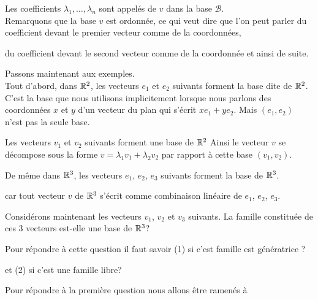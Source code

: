 \change
Les coefficients $\lambda_1,\ldots,\lambda_n$ sont appelés  de $v$ dans la base $\mathcal{B}$. \\

\change
Remarquons que la base $v$ est ordonnée, ce qui veut dire que l'on peut 
parler du coefficient devant le premier vecteur comme de la  coordonnées, 

\change
du coefficient devant le second vecteur comme de la  coordonnée et ainsi de suite.




\diapo
Passons maintenant aux exemples.\\

Tout d'abord, dans $\mathbb{R}^2$, les vecteurs $e_1$ et $e_2$ 
suivants forment la base dite  de $\mathbb{R}^2$. 
C'est la base que nous utilisons implicitement  
lorsque nous parlons des coordonnées $x$ et $y$ d'un vecteur du plan qui s'écrit
$xe_1+ye_2$. 
Mais $(e_1,e_2)$ n'est pas la seule base.

\change
Les vecteurs $v_1$ et $v_2$ suivants forment  une base de $\mathbb{R}^2$ 
Ainsi le  vecteur $v$ 
se décompose sous la forme $v=\lambda_1 v_1 + \lambda_2 v_2$
par rapport à cette base $(v_1, v_2)$.

\change
De même dans $\mathbb{R}^3$, les vecteurs $e_1$, $e_2$, $e_3$ 
suivants forment la base  de $\mathbb{R}^3$.

\change
car tout vecteur $v$ de $\mathbb{R}^3$ s'écrit comme combinaison linéaire de $e_1$, $e_2$, $e_3$.

\diapo


Considérons maintenant les vecteurs $v_1$, $v_2$ et $v_3$ suivants. 
La famille constituée de ces 3 vecteurs est-elle une base de $\mathbb{R}^3$? 

\change
Pour répondre à cette question il faut savoir 
(1) si c'est famille est génératrice ?

\change
et (2) si c'est une famille libre?


\change
Pour répondre à la première question nous allons \^etre ramenés à  

